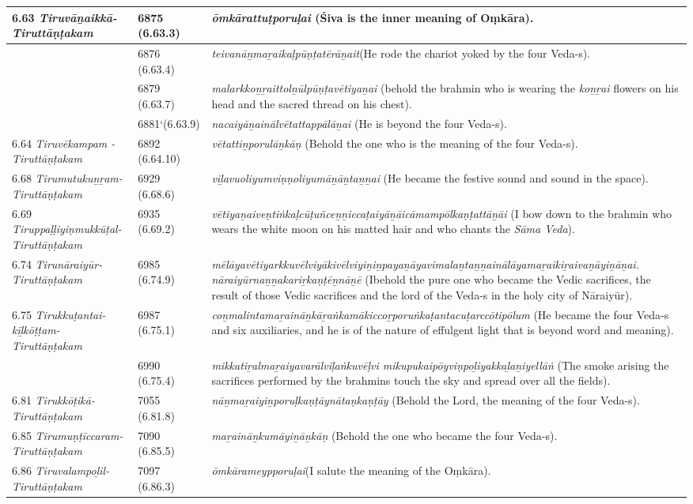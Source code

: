 \begin{longtable}{|m{2.7cm}|m{2.7cm}|>{\raggedright}m{3.1cm}|}
\hline
6.63 \textit{Tiruvāṉaikkā- Tiruttāṇṭakam} & 6875 (6.63.3) & \textit{ōmkārattuṭporuḷai} (Śiva is the inner meaning of   Oṃkāra). \tabularnewline
\hline
 & 6876 (6.63.4) & \textit{teivanāṉmaṟaikaḷpūṇ\-ṭatērāṉait}(He rode the chariot yoked by the four Veda-s). \tabularnewline
\hline
 & 6879 (6.63.7) & \textit{malarkkoṉṟaittolṉūl\-pūṇṭavētiyaṉai} (behold the brahmin who is wearing the \textit{koṉṟai} flowers on his head and the sacred thread on his chest). \tabularnewline
\hline
 & 6881`(6.63.9) & \textit{nacaiyāṉainālvētatta\-ppālāṉai} (He is beyond the four Veda-s). \tabularnewline
\hline
6.64 \textit{Tiruvēkampam - Tiruttāṇṭakam} & 6892 (6.64.10) & \textit{vētattiṉporulāṉkāṇ} (Behold the one who is the meaning of the four Veda-s). \tabularnewline
\hline
6.68 \textit{Tirumutukuṉ\-ṟam-Tiruttāṇ\-ṭakam} & 6929 (6.68.6) & \textit{viḻavuoliyumviṇṇoli\-yumāṉāṉtaṉṉai} (He became the festive sound and sound in the space). \tabularnewline
\hline
6.69 \textit{Tiruppaḷḷiyiṇmu\-kkūṭal-Tiruttāṇ\-ṭakam} & 6935 (6.69.2) & \textit{vētiyaṉaiveṇtiṅkaḷcū\-ṭuñceṉṉiccaṭaiyāṉāi\-cāmampōlkaṇṭattāṉāi} (I bow down to the brahmin who wears the white moon on his matted hair  and who chants the \textit{Sāma Veda}). \tabularnewline
\hline
6.74 \textit{Tirunāraiyūr- Tiruttāṇṭakam} & 6985 (6.74.9) & \textit{mēlāyavētiyarkkuvēl\-viyākivēlviyiṉiṉpaya\-ṉāyavimalaṉtaṉṉai\-nālāyamaṟaikiṟaiva\-ṉāyiṉāṉai. nāraiyūrnaṉṉakariṟkaṇṭēṉnāṉē} (Ibehold the pure one who became the Vedic sacrifices, the result of those Vedic sacrifices and the lord of the Veda-s in the holy city of Nāraiyūr). \tabularnewline
\hline
6.75 \textit{Tirukkuṭantai-kīḻkōṭṭam- Tiruttāṇ\-ṭakam} & 6987 (6.75.1) & \textit{coṉmalintamaṟaināṉ\-kāṟaṅkamākiccoṟpo\-ruṅkaṭantacuṭarccōti\-pōlum} (He became the four Veda-s and six auxiliaries, and he is of the nature of effulgent light that is beyond word and meaning). \tabularnewline
\hline
 & 6990 (6.75.4) & \textit{mikkatiṟalmaṟaiyava\-rālviḷaṅkuvēḷvi mikupukaipōyviṇpoḻi\-yakkaḻaṉiyellāṅ}  (The smoke arising the sacrifices performed by the brahmins touch the sky and spread over all the fields). \tabularnewline
\hline
6.81 \textit{Tirukkōṭikā- Tiruttāṇṭakam} & 7055 (6.81.8) & \textit{nāṉmaṟaiyiṉporuḷkaṇ\-ṭāynātaṇkaṇṭāy} (Behold  the Lord, the meaning of the four Veda-s). \tabularnewline
\hline
6.85 \textit{Tirumuṇṭīccaram- Tiruttāṇṭakam} & 7090 (6.85.5) & \textit{maṟaināṉkumāyiṉāṉ\-kāṇ} (Behold the one who became the four Veda-s). \tabularnewline
\hline
6.86 \textit{Tiruvalampoḻil- Tiruttāṇṭakam} & 7097 (6.86.3) & \textit{ōmkārameypporuḷai}\break  (I salute the meaning of the Oṃkāra). \tabularnewline

\end{longtable}
